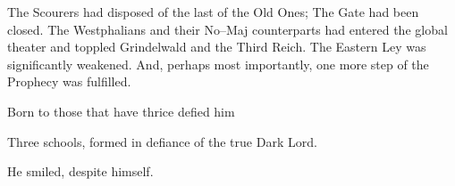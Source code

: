 The Scourers had disposed of the last of the Old Ones; The Gate had been closed. The Westphalians and their No\mbox{--}Maj counterparts had entered the global theater and toppled Grindelwald and the Third Reich. The Eastern Ley was significantly weakened. And, perhaps most importantly, one more step of the Prophecy was fulfilled.

Born to those that have thrice defied him{\el}

Three schools, formed in defiance of the true Dark Lord.

He smiled, despite himself.

